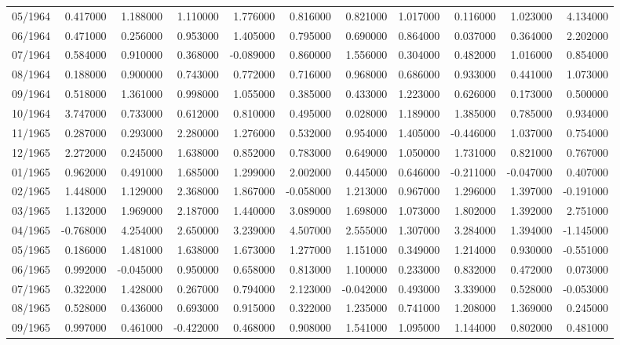 \begin{tabular}{lrrrrrrrrrr}
05/1964 & 0.417000 & 1.188000 & 1.110000 & 1.776000 & 0.816000 & 0.821000 & 1.017000 & 0.116000 & 1.023000 & 4.134000 \\
06/1964 & 0.471000 & 0.256000 & 0.953000 & 1.405000 & 0.795000 & 0.690000 & 0.864000 & 0.037000 & 0.364000 & 2.202000 \\
07/1964 & 0.584000 & 0.910000 & 0.368000 & -0.089000 & 0.860000 & 1.556000 & 0.304000 & 0.482000 & 1.016000 & 0.854000 \\
08/1964 & 0.188000 & 0.900000 & 0.743000 & 0.772000 & 0.716000 & 0.968000 & 0.686000 & 0.933000 & 0.441000 & 1.073000 \\
09/1964 & 0.518000 & 1.361000 & 0.998000 & 1.055000 & 0.385000 & 0.433000 & 1.223000 & 0.626000 & 0.173000 & 0.500000 \\
10/1964 & 3.747000 & 0.733000 & 0.612000 & 0.810000 & 0.495000 & 0.028000 & 1.189000 & 1.385000 & 0.785000 & 0.934000 \\
11/1965 & 0.287000 & 0.293000 & 2.280000 & 1.276000 & 0.532000 & 0.954000 & 1.405000 & -0.446000 & 1.037000 & 0.754000 \\
12/1965 & 2.272000 & 0.245000 & 1.638000 & 0.852000 & 0.783000 & 0.649000 & 1.050000 & 1.731000 & 0.821000 & 0.767000 \\
01/1965 & 0.962000 & 0.491000 & 1.685000 & 1.299000 & 2.002000 & 0.445000 & 0.646000 & -0.211000 & -0.047000 & 0.407000 \\
02/1965 & 1.448000 & 1.129000 & 2.368000 & 1.867000 & -0.058000 & 1.213000 & 0.967000 & 1.296000 & 1.397000 & -0.191000 \\
03/1965 & 1.132000 & 1.969000 & 2.187000 & 1.440000 & 3.089000 & 1.698000 & 1.073000 & 1.802000 & 1.392000 & 2.751000 \\
04/1965 & -0.768000 & 4.254000 & 2.650000 & 3.239000 & 4.507000 & 2.555000 & 1.307000 & 3.284000 & 1.394000 & -1.145000 \\
05/1965 & 0.186000 & 1.481000 & 1.638000 & 1.673000 & 1.277000 & 1.151000 & 0.349000 & 1.214000 & 0.930000 & -0.551000 \\
06/1965 & 0.992000 & -0.045000 & 0.950000 & 0.658000 & 0.813000 & 1.100000 & 0.233000 & 0.832000 & 0.472000 & 0.073000 \\
07/1965 & 0.322000 & 1.428000 & 0.267000 & 0.794000 & 2.123000 & -0.042000 & 0.493000 & 3.339000 & 0.528000 & -0.053000 \\
08/1965 & 0.528000 & 0.436000 & 0.693000 & 0.915000 & 0.322000 & 1.235000 & 0.741000 & 1.208000 & 1.369000 & 0.245000 \\
09/1965 & 0.997000 & 0.461000 & -0.422000 & 0.468000 & 0.908000 & 1.541000 & 1.095000 & 1.144000 & 0.802000 & 0.481000 \\

\end{tabular}
